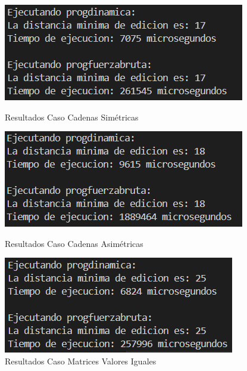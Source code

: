\begin{figure}[h!]
    \vspace{1em}

    \begin{minipage}{0.47\textwidth}
        \centering
        \includegraphics[width=\linewidth]{./images/Resultados3.png}
        \caption{Resultados Caso Cadenas Simétricas}
        \label{fig:imagen8}
    \end{minipage}
    \hfill
    \begin{minipage}{0.47\textwidth}
        \centering
        \includegraphics[width=\linewidth]{./images/Resultados4.png} 
        \caption{Resultados Caso Cadenas Asimétricas}
        \label{fig:imagen9}
    \end{minipage}

    \vspace{1em}

    \centering
    \begin{minipage}{0.5\textwidth}
        \centering
        \includegraphics[width=\linewidth]{./images/Resultados5.png} 
        \caption{Resultados Caso Matrices Valores Iguales}
        \label{fig:imagen10}
    \end{minipage}
\end{figure}